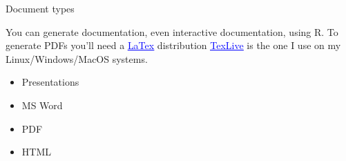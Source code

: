 \documentclass{beamer}
\begin{document}
\begin{frame}{
	\begin{minipage}[t]{0.75\textwidth}
		Document types
	\end{minipage}
	\hfill
	\begin{minipage}[t]{0.25\textwidth}
		\flushright
	\end{minipage}
}{}
You can generate documentation, even interactive documentation, using R. To generate PDFs you'll need a \href{https://www.latex-project.org/}{\textcolor{blue}{\underline{LaTex}}} distribution \href{https://www.tug.org/texlive/}{\textcolor{blue}{\underline{TexLive}}} is the one I use on my Linux/Windows/MacOS systems.

\begin{itemize}
	\item Presentations
	\item MS Word
	\item PDF
	\item HTML
\end{itemize}

\end{frame}
\end{document}
